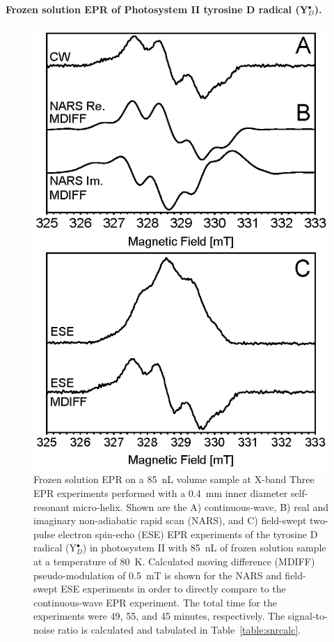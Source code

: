 \paragraph{Frozen solution EPR of Photosystem II tyrosine D radical (Y$_D^\bullet$).}
\begin{figure}[htbp]
\centering
\includegraphics{Kapitel/Ch4-Images/02-PSII-BBY-Data.eps}
\caption[Frozen solution EPR on a 85~nL volume sample at X-band.]{Frozen solution EPR on a 85~nL volume sample at X-band Three EPR experiments performed with a 0.4~mm inner diameter self-resonant micro-helix. Shown are the A) continuous-wave, B) real and imaginary non-adiabatic rapid scan (NARS), and C) field-swept two-pulse electron spin-echo (ESE) EPR experiments of the tyrosine D radical (Y$_D^\bullet$) in photosystem II with 85~nL of frozen solution sample at a temperature of 80~K. Calculated moving difference (MDIFF) pseudo-modulation of 0.5~mT is shown for the NARS and field-swept ESE experiments in order to directly compare to the continuous-wave EPR experiment. The total time for the experiments were 49, 55, and 45 minutes, respectively. The signal-to-noise ratio is calculated and tabulated in Table~\ref{table:snrcalc}.}
\label{fig:BBYPSII}
\end{figure}

